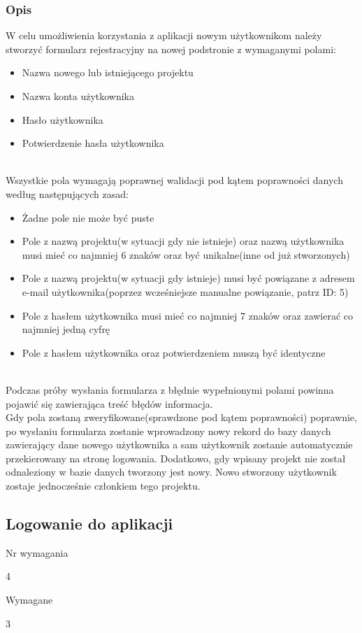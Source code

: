\documentclass[eng,printmode]{mgr}
\begin{document}
\subsubsection{Opis}
W celu umożliwienia korzystania z aplikacji nowym użytkownikom należy stworzyć formularz rejestracyjny na nowej podstronie z wymaganymi polami:
\begin{itemize}
	\item[--] Nazwa nowego lub istniejącego projektu
	\item[--] Nazwa konta użytkownika
	\item[--] Hasło użytkownika
	\item[--] Potwierdzenie hasła użytkownika
\end{itemize}
\ \\
Wszystkie pola wymagają poprawnej walidacji pod kątem poprawności danych według następujących zasad:
\begin{itemize}
	\item[--] Żadne pole nie może być puste
	\item[--] Pole z nazwą projektu(w sytuacji gdy nie istnieje) oraz nazwą użytkownika musi mieć co najmniej 6 znaków oraz być unikalne(inne od już stworzonych)
	\item[--] Pole z nazwą projektu(w sytuacji gdy istnieje) musi być powiązane z adresem e-mail użytkownika(poprzez wcześniejsze manualne powiązanie, patrz ID: 5)
	\item[--] Pole z hasłem użytkownika musi mieć co najmniej 7 znaków oraz zawierać co najmniej jedną cyfrę
	\item[--] Pole z hasłem użytkownika oraz potwierdzeniem muszą być identyczne
\end{itemize}
\ \\
Podczas próby wysłania formularza z błędnie wypełnionymi polami powinna pojawić się zawierająca treść błędów informacja.
\\
Gdy pola zostaną zweryfikowane(sprawdzone pod kątem poprawności) poprawnie, po wysłaniu formularza zostanie wprowadzony nowy rekord do bazy danych zawierający dane nowego użytkownika a sam użytkownik zostanie automatycznie przekierowany na stronę logowania. Dodatkowo, gdy wpisany projekt nie został odnaleziony w bazie danych tworzony jest nowy. Nowo stworzony użytkownik zostaje jednocześnie członkiem tego projektu.
\newpage

\subsection{Logowanie do aplikacji}
\begin{labeling}{Nr wymagania}
\item [Nr wymagania:] 4
\item [Priorytet:] Wymagane
\item [Powiązania:] 3
\end{labeling}
\end{document}

